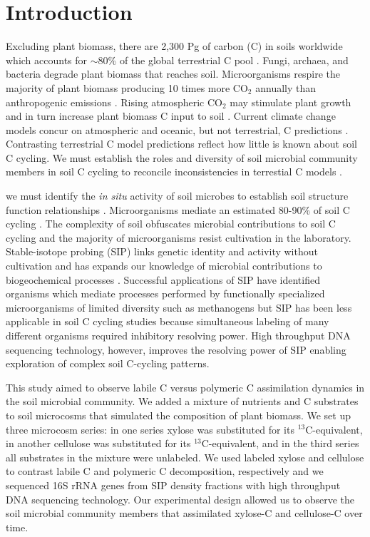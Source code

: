 \section{Introduction}
Excluding plant biomass, there are 2,300 Pg of carbon (C) in soils
worldwide which accounts for $\sim$80\% of the global terrestrial C pool
\citep{Amundson_2001,BATJES_1996}. Fungi, archaea, and bacteria degrade plant
biomass that reaches soil. Microorganisms respire the majority of plant biomass
producing 10 times more CO$_{2}$ annually than anthropogenic emissions
\citep{chapin2002principles}. Rising atmospheric CO$_{2}$ may stimulate
plant growth and in turn increase plant biomass C input to soil
\citep{Groenigen_2006}. Current climate change models concur on
atmospheric and oceanic, but not terrestrial, C predictions
\citep{Friedlingstein_2006}. Contrasting terrestrial C model predictions
reflect how little is known about soil C cycling. We must establish the roles
and diversity of soil microbial community members in soil C cycling to
reconcile inconsistencies in terrestial C models
\citep{Neff_2001,McGuire2010a}.

we must identify the \textit{in situ} activity of soil microbes to establish
soil structure function relationships  \citep{O_Donnell_2002}. Microorganisms
mediate an estimated 80-90\% of soil C cycling
\citep{ColemanCrossley_1996,Nannipieri_2003}. The complexity of soil obfuscates
microbial contributions to soil C cycling and the majority of microorganisms
resist cultivation in the laboratory. Stable-isotope probing (SIP) links
genetic identity and activity without cultivation and has expands our knowledge
of microbial contributions to biogeochemical processes
\citep{Chen_Murrell_2010}. Successful applications of SIP have identified
organisms which mediate processes performed by functionally specialized
microorganisms of limited diversity such as methanogens \citep{Lu_2005} but SIP
has been less applicable in soil C cycling studies because simultaneous
labeling of many different organisms required inhibitory resolving power. High
throughput DNA sequencing technology, however, improves the resolving power of
SIP enabling exploration of complex soil C-cycling patterns.

This study aimed to observe labile C versus polymeric C assimilation dynamics
in the soil microbial community. We added a mixture of nutrients and
C substrates to soil microcosms that simulated the composition of plant
biomass. We set up three microcosm series: in one series xylose was substituted
for its $^{13}$C-equivalent, in another cellulose was substituted for its
$^{13}$C-equivalent, and in the third series all substrates in the mixture were
unlabeled. We used labeled xylose and cellulose to contrast labile C and
polymeric C decomposition, respectively and we sequenced 16S rRNA genes from
SIP density fractions with high throughput DNA sequencing technology. Our
experimental design allowed us to observe the soil microbial community members
that assimilated xylose-C and cellulose-C over time.
